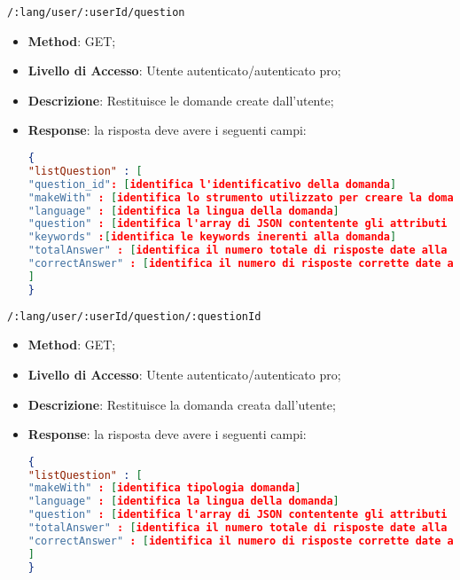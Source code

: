 \item \texttt{/:lang/user/:userId/question}
	\begin{itemize}
		\item \textbf{Method}: GET;
		\item \textbf{Livello di Accesso}: Utente autenticato/autenticato pro;
		\item \textbf{Descrizione}: Restituisce le domande create dall'utente;
		\item \textbf{Response}: la risposta deve avere i seguenti campi:
\begin{lstlisting}[language=json,firstnumber=1]
{
"listQuestion" : [ 
"question_id": [identifica l'identificativo della domanda]
"makeWith" : [identifica lo strumento utilizzato per creare la domanda]
"language" : [identifica la lingua della domanda]
"question" : [identifica l'array di JSON contentente gli attributi che formano una domanda]
"keywords" :[identifica le keywords inerenti alla domanda]
"totalAnswer" : [identifica il numero totale di risposte date alla domanda]
"correctAnswer" : [identifica il numero di risposte corrette date alla domanda]
]
}
\end{lstlisting}
	\end{itemize}	

\item \texttt{/:lang/user/:userId/question/:questionId}
	\begin{itemize}
		\item \textbf{Method}: GET;
		\item \textbf{Livello di Accesso}: Utente autenticato/autenticato pro;
		\item \textbf{Descrizione}: Restituisce la domanda creata dall'utente;
		\item \textbf{Response}: la risposta deve avere i seguenti campi:
\begin{lstlisting}[language=json,firstnumber=1]
{
"listQuestion" : [ 
"makeWith" : [identifica tipologia domanda]
"language" : [identifica la lingua della domanda]
"question" : [identifica l'array di JSON contentente gli attributi che formano una domanda]
"totalAnswer" : [identifica il numero totale di risposte date alla domanda]
"correctAnswer" : [identifica il numero di risposte corrette date alla domanda]
]
}
\end{lstlisting}
	\end{itemize}	
	

